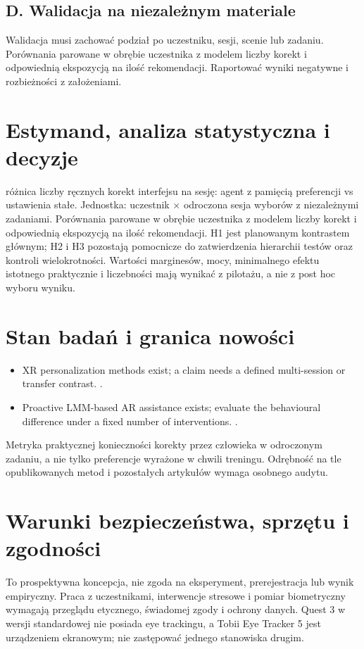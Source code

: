 \documentclass[11pt,a4paper]{article}
\begin{document}
\subsection{D. Walidacja na niezależnym materiale}
Walidacja musi zachować podział po uczestniku, sesji, scenie lub zadaniu. Porównania parowane w obrębie uczestnika z modelem liczby korekt i odpowiednią ekspozycją na ilość rekomendacji. Raportować wyniki negatywne i rozbieżności z założeniami.
\section{Estymand, analiza statystyczna i decyzje}
różnica liczby ręcznych korekt interfejsu na sesję: agent z pamięcią preferencji vs ustawienia stałe. Jednostka: uczestnik × odroczona sesja wyborów z niezależnymi zadaniami. Porównania parowane w obrębie uczestnika z modelem liczby korekt i odpowiednią ekspozycją na ilość rekomendacji. H1 jest planowanym kontrastem głównym; H2 i H3 pozostają pomocnicze do zatwierdzenia hierarchii testów oraz kontroli wielokrotności. Wartości marginesów, mocy, minimalnego efektu istotnego praktycznie i liczebności mają wynikać z pilotażu, a nie z post hoc wyboru wyniku.
\section{Stan badań i granica nowości}
\begin{itemize}
\item XR personalization methods exist; a claim needs a defined multi-session or transfer contrast. \cite{xrprior1}.
\item Proactive LMM-based AR assistance exists; evaluate the behavioural difference under a fixed number of interventions. \cite{xrprior2}.
\end{itemize}
Metryka praktycznej konieczności korekty przez człowieka w odroczonym zadaniu, a nie tylko preferencje wyrażone w chwili treningu. Odrębność na tle opublikowanych metod i pozostałych artykułów wymaga osobnego audytu.
\section{Warunki bezpieczeństwa, sprzętu i zgodności}
To prospektywna koncepcja, nie zgoda na eksperyment, prerejestracja lub wynik empiryczny. Praca z uczestnikami, interwencje stresowe i pomiar biometryczny wymagają przeglądu etycznego, świadomej zgody i ochrony danych. Quest 3 w wersji standardowej nie posiada eye trackingu, a Tobii Eye Tracker 5 jest urządzeniem ekranowym; nie zastępować jednego stanowiska drugim.
\end{document}
